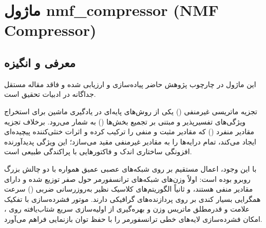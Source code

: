 \section{ماژول nmf\_compressor (NMF Compressor)}
\label{sec:module_nmf_compressor}

\subsection{معرفی و انگیزه}
این ماژول در چارچوب پژوهش حاضر پیاده‌سازی و ارزیابی شده و فاقد مقاله مستقل جداگانه در ادبیات تحقیق است.

تجزیه ماتریسی غیرمنفی () یکی از روش‌های پایه‌ای در یادگیری ماشین برای استخراج ویژگی‌های تفسیرپذیر و مبتنی بر تجمیع بخش‌ها () به شمار می‌رود. برخلاف تجزیه مقادیر منفرد () که مقادیر مثبت و منفی را ترکیب کرده و اثرات خنثی‌کننده پیچیده‌ای ایجاد می‌کند،  تمام درایه‌ها را به مقادیر غیرمنفی مقید می‌سازد؛ این ویژگی پدیدآورنده افزونگی ساختاری اندک و فاکتورهایی با پراکندگی طبیعی است.

با این وجود، اعمال مستقیم  بر روی شبکه‌های عصبی عمیق همواره با دو چالش بزرگ روبرو بوده است: اولاً وزن‌های شبکه‌های ترانسفورمر حول صفر توزیع شده و دارای مقادیر منفی هستند، و ثانیاً الگوریتم‌های کلاسیک  نظیر به‌روزرسانی ضربی () سرعت همگرایی بسیار کندی بر روی پردازنده‌های گرافیکی دارند. موتور فشرده‌سازی  با تفکیک علامت و قدرمطلق ماتریس وزن و بهره‌گیری از اولیه‌سازی سریع  شتاب‌یافته روی ، امکان فشرده‌سازی لایه‌های خطی ترانسفورمر را با حفظ توان بازنمایی فراهم می‌آورد.


